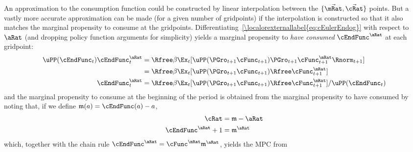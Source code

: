 \documentclass[\econtexRoot/BufferStockTheory]{subfiles}
\begin{document}
An approximation to the consumption function could be constructed by linear interpolation between the $\{\vec{\mRat},\vec{\cRat}\}$ points.  But a vastly more accurate approximation can be made (for a given number of gridpoints) if the interpolation is constructed so that it also matches the marginal propensity to consume at the gridpoints. Differentiating~\eqref{\localorexternallabel{eq:cEulerEndog}} with respect to $\aRat$ (and dropping policy function arguments for simplicity) yields a marginal propensity to \textit{have consumed} $\cEndFunc^{\aRat}$ at each gridpoint:
\begin{equation}\begin{gathered}\begin{aligned}
\uPP(\cEndFunc_{t})\cEndFunc_{t}^{\aRat}  & = \Rfree \beta \Ex_{t}[\uPP(\PGro_{t+1} \cFunc_{t+1})\PGro_{t+1} \cFunc^{\mRat}_{t+1}\Rnorm_{t+1}] \notag
\\  & = \Rfree \beta \Ex_{t}[\uPP(\PGro_{t+1} \cFunc_{t+1}) \Rfree \cFunc^{\mRat}_{t+1}] \notag
\\ \cEndFunc_{t}^{\aRat}  & = \Rfree \beta \Ex_{t}[\uPP(\PGro_{t+1}  \cFunc_{t+1}) \Rfree \cFunc^{\mRat}_{t+1}]/\uPP(\cEndFunc_{t}) \label{eq:MPTHC}
\end{aligned}\end{gathered}\end{equation}
and the marginal propensity to consume at the beginning of the period is obtained from the marginal
propensity to have consumed by noting that, if we define $\mathfrak{m}(a) = \cEndFunc(a)-a$,
\begin{align*}
   \cRat  & = \mathfrak{m}-\aRat
\\ \cEndFunc^{\aRat}+1  & = \mathfrak{m}^{\aRat}
\end{align*}
which, together with the chain rule $\cEndFunc^{\aRat}  = \cFunc^{\mRat}\mathfrak{m}^{\aRat}$,
yields the MPC from
\end{document}
